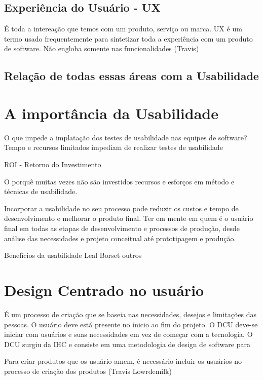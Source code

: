 \subsection{Experiência do Usuário - UX}
É toda a intereação que temos com um produto, serviço ou marca.
UX é um termo usado frequentemente para sintetizar toda a experiência com um produto de software. Não engloba  somente nas funcionalidades (Travis)


\subsection{Relação de todas essas áreas com a Usabilidade}

\section{A importância da Usabilidade}

O que impede a implatação dos testes de usabilidade nas equipes de software?
Tempo e recursos limitados impediam de realizar testes de usabilidade

ROI - Retorno do Investimento

O porquê muitas vezes não são investidos recursos e esforços em método e técnicas de usabilidade.

Incorporar a usabilidade no seu processo pode reduzir os custos e tempo de desenvolvimento e melhorar o produto final. Ter em mente  em quem é o usuário final em todas as etapas de desenvolvimento e processos de produção, desde análise das necessidades e projeto conceitual até prototipagem e produção. 


Benefícios da usabilidade
Leal
Borset 
outros


\section{Design Centrado no usuário}

É um processo de criação que se baseia nas necessidades, desejos e limitações das pessoas. O usuário deve está presente no ínicio ao fim do projeto.
O DCU deve-se iniciar com usuários e suas necessidades em vez de começar com a tecnologia.
O DCU surgiu da IHC e consiste em uma metodologia de design de software para 


Para criar produtos que os usuário amem, é necessário incluir os usuários no processo de criação dos produtos (Travis Lowrdemilk)

